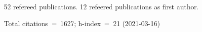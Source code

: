 52 refereed publications. 12 refeered publications as first author.

Total citations~=~1627; h-index~=~21 (2021-03-16)